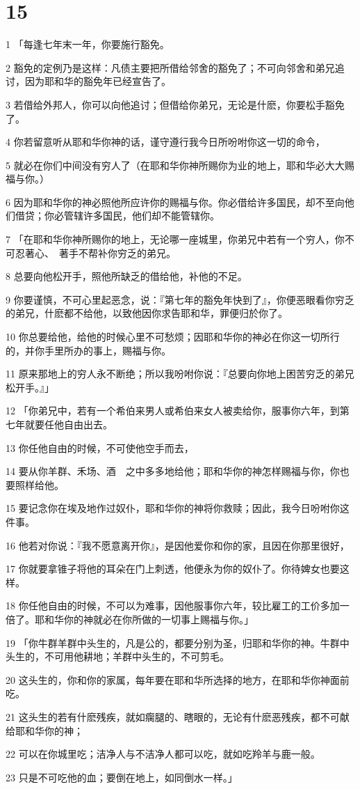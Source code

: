 \chapter{15}

\par 1 「每逢七年末一年，你要施行豁免。
\par 2 豁免的定例乃是这样：凡债主要把所借给邻舍的豁免了；不可向邻舍和弟兄追讨，因为耶和华的豁免年已经宣告了。
\par 3 若借给外邦人，你可以向他追讨；但借给你弟兄，无论是什麽，你要松手豁免了。
\par 4 你若留意听从耶和华你神的话，谨守遵行我今日所吩咐你这一切的命令，
\par 5 就必在你们中间没有穷人了（在耶和华你神所赐你为业的地上，耶和华必大大赐福与你。）
\par 6 因为耶和华你的神必照他所应许你的赐福与你。你必借给许多国民，却不至向他们借贷；你必管辖许多国民，他们却不能管辖你。
\par 7 「在耶和华你神所赐你的地上，无论哪一座城里，你弟兄中若有一个穷人，你不可忍著心、　著手不帮补你穷乏的弟兄。
\par 8 总要向他松开手，照他所缺乏的借给他，补他的不足。
\par 9 你要谨慎，不可心里起恶念，说：『第七年的豁免年快到了』，你便恶眼看你穷乏的弟兄，什麽都不给他，以致他因你求告耶和华，罪便归於你了。
\par 10 你总要给他，给他的时候心里不可愁烦；因耶和华你的神必在你这一切所行的，并你手里所办的事上，赐福与你。
\par 11 原来那地上的穷人永不断绝；所以我吩咐你说：『总要向你地上困苦穷乏的弟兄松开手。』」
\par 12 「你弟兄中，若有一个希伯来男人或希伯来女人被卖给你，服事你六年，到第七年就要任他自由出去。
\par 13 你任他自由的时候，不可使他空手而去，
\par 14 要从你羊群、禾场、酒　之中多多地给他；耶和华你的神怎样赐福与你，你也要照样给他。
\par 15 要记念你在埃及地作过奴仆，耶和华你的神将你救赎；因此，我今日吩咐你这件事。
\par 16 他若对你说：『我不愿意离开你』，是因他爱你和你的家，且因在你那里很好，
\par 17 你就要拿锥子将他的耳朵在门上刺透，他便永为你的奴仆了。你待婢女也要这样。
\par 18 你任他自由的时候，不可以为难事，因他服事你六年，较比雇工的工价多加一倍了。耶和华你的神就必在你所做的一切事上赐福与你。」
\par 19 「你牛群羊群中头生的，凡是公的，都要分别为圣，归耶和华你的神。牛群中头生的，不可用他耕地；羊群中头生的，不可剪毛。
\par 20 这头生的，你和你的家属，每年要在耶和华所选择的地方，在耶和华你神面前吃。
\par 21 这头生的若有什麽残疾，就如瘸腿的、瞎眼的，无论有什麽恶残疾，都不可献给耶和华你的神；
\par 22 可以在你城里吃；洁净人与不洁净人都可以吃，就如吃羚羊与鹿一般。
\par 23 只是不可吃他的血；要倒在地上，如同倒水一样。」

